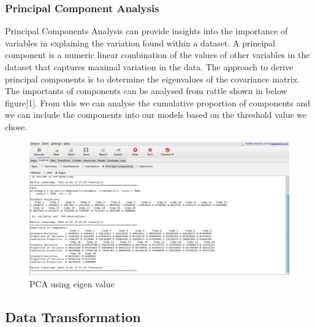 \documentclass{article}\usepackage[]{graphicx}\usepackage[]{color}
\begin{document}
\subsubsection{Principal Component Analysis}Principal Components Analysis can provide insights into the importance of variables in explaining the variation found within a dataset. A principal component is a numeric linear combination of the values of other variables in the dataset that captures maximal variation in the data. The approach to derive principal components is to determine the eigenvalues of the covariance matrix\cite{[5]}. The importants of components can be analysed from rattle shown in below figure[1]. From this we can analyse the cumulative proportion of components and we can include the components into our models based on the threshold value we chose.\\
\begin{figure}[h]
\begin{center}
\includegraphics [scale=0.40]{pca.png}
\end{center}
\caption{PCA using eigen value}
\end{figure}

\subsection{Data Transformation}
\end{document}
